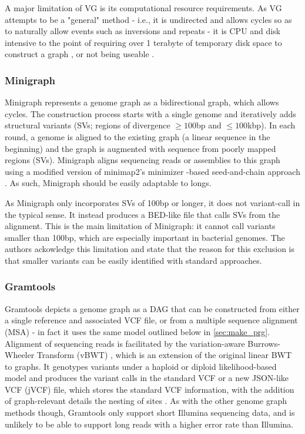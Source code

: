 A major limitation of VG is its computational resource requirements. As VG attempts to be a "general" method - i.e., it is undirected and allows cycles so as to naturally allow events such as inversions and repeats - it is CPU and disk intensive \cite{strainflair2021,gramtools2021,minigraph2020} to the point of requiring over 1 terabyte of temporary disk space to construct a graph \cite{gramtools2021}, or not being useable \cite{minigraph2020}.

\subsubsection{Minigraph}
Minigraph \cite{minigraph2020} represents a genome graph as a bidirectional graph, which allows cycles. The construction process starts with a single genome and iteratively adds structural variants (SVs; regions of divergence $\ge 100$bp and $\le 100$kbp). In each round, a genome is aligned to the existing graph (a linear sequence in the beginning) and the graph is augmented with sequence from poorly mapped regions (SVs). Minigraph aligns sequencing reads or assemblies to this graph using a modified version of minimap2's minimizer \kmer{}-based seed-and-chain approach \cite{li2018}. As such, Minigraph should be easily adaptable to longs.

As Minigraph only incorporates SVs of 100bp or longer, it does not variant-call in the typical sense. It instead produces a BED-like file that calls SVs from the alignment. This is the main limitation of Minigraph: it cannot call variants smaller than 100bp, which are especially important in bacterial genomes. The authors ackowledge this limitation and state that the reason for this exclusion is that smaller variants can be easily identified with standard approaches. 

\subsubsection{Gramtools}
Gramtools \cite{gramtools2016,gramtools2021} depicts a genome graph as a DAG that can be constructed from either a single reference and associated VCF file, or from a multiple sequence alignment (MSA) - in fact it uses the same model outlined below in \autoref{sec:make_prg}. Alignment of sequencing reads is facilitated by the variation-aware Burrows-Wheeler Transform (vBWT) \cite{gramtools2016}, which is an extension of the original linear BWT to graphs. It genotypes variants under a haploid or diploid likelihood-based model and produces the variant calls in the standard VCF or a new JSON-like VCF (jVCF) file, which stores the standard VCF information, with the addition of graph-relevant details the nesting of sites \cite{gramtools2021}. As with the other genome graph methods though, Gramtools only support short Illumina sequencing data, and is unlikely to be able to support long reads with a higher error rate than Illumina.

